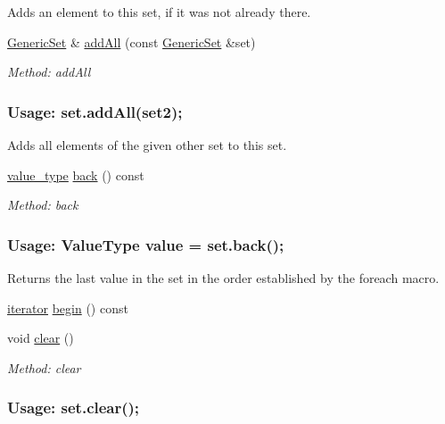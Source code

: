 \begin{DoxyCompactItemize}
\begin{DoxyCompactList}
Adds an element to this set, if it was not already there. \end{DoxyCompactList}\item 
\mbox{\hyperlink{classstanfordcpplib_1_1collections_1_1GenericSet}{Generic\+Set}} \& \mbox{\hyperlink{classstanfordcpplib_1_1collections_1_1GenericSet_ad7f4cd8986fd068b79d2a69a79348a7e}{add\+All}} (const \mbox{\hyperlink{classstanfordcpplib_1_1collections_1_1GenericSet}{Generic\+Set}} \&set)
\begin{DoxyCompactList}\small\item\em Method\+: add\+All \subsubsection*{Usage\+: set.\+add\+All(set2); }

Adds all elements of the given other set to this set. \end{DoxyCompactList}\item 
\mbox{\hyperlink{classstanfordcpplib_1_1collections_1_1GenericSet_a669c81f158766925e7293f97c0099b28}{value\+\_\+type}} \mbox{\hyperlink{classstanfordcpplib_1_1collections_1_1GenericSet_a4b351b4cfc065bb0eee5d8c7404c3147}{back}} () const
\begin{DoxyCompactList}\small\item\em Method\+: back \subsubsection*{Usage\+: Value\+Type value = set.\+back(); }

Returns the last value in the set in the order established by the {\ttfamily foreach} macro. \end{DoxyCompactList}\item 
\mbox{\hyperlink{classstanfordcpplib_1_1collections_1_1GenericSet_ab3d10e70baaeac78e76b7abae7e2cf76}{iterator}} \mbox{\hyperlink{classstanfordcpplib_1_1collections_1_1GenericSet_a0c62c15c8ed609e7e5e9518cf5f5c712}{begin}} () const
\item 
void \mbox{\hyperlink{classstanfordcpplib_1_1collections_1_1GenericSet_ac8bb3912a3ce86b15842e79d0b421204}{clear}} ()
\begin{DoxyCompactList}\small\item\em Method\+: clear \subsubsection*{Usage\+: set.\+clear(); }


\end{DoxyCompactList}
\end{DoxyCompactItemize}
